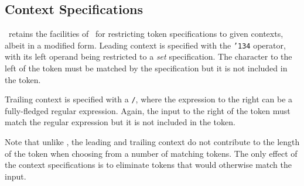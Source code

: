 \subsection{Context Specifications}
\label{sec-context-specifications}

\lx\ retains the facilities of \lex\ for restricting token specifications to
given contexts, albeit in a modified form.  Leading context is specified with
the \mbox{\tt {\char'134}} operator, with its left operand being restricted to a {\em set}
specification.  The character to the left of the token must be matched by the
specification but it is not included in the token.

Trailing context is specified with a \mbox{\tt /}, where the expression to the right can
be a fully-fledged regular expression.  Again, the input to the right of the
token must match the regular expression but it is not included in the token.

Note that unlike \lex, the leading and trailing context do not contribute to
the length of the token when choosing from a number of matching tokens.  The
only effect of the context specifications is to eliminate tokens that would
otherwise match the input.


